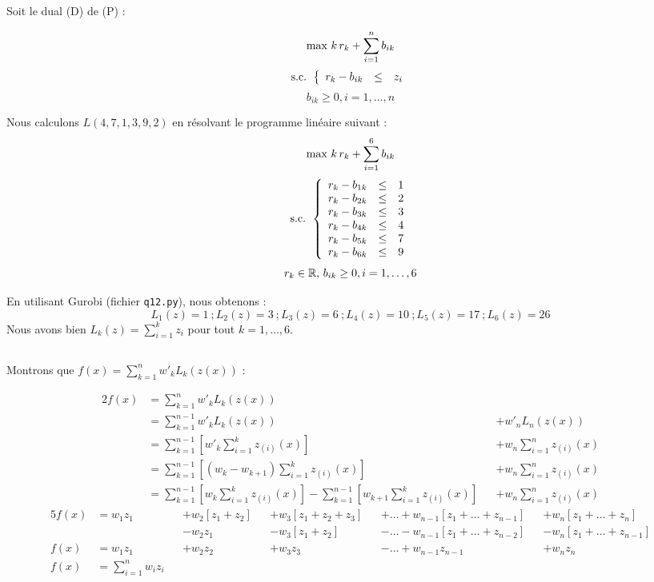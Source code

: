 \documentclass{article}
\begin{document}
Soit le dual (D) de (P) :

$$\textmd{max } k\,r_{k} + \sum_{i = 1}^{n}b_{ik}$$
$$ \textmd{s.c. }
\left \{
\begin{array}{r c l}
  r_k - b_{ik} & \leq & z_{i} \\
\end{array}
\right .
$$
$$b_{ik} \geq 0, i=1,\ldots,n$$

Nous calculons $L(4,7,1,3,9,2)$ en résolvant le programme linéaire suivant :
$$\textmd{max } k\,r_{k} + \sum_{i = 1}^{6}b_{ik}$$
$$ \textmd{s.c. }
\left \{
\begin{array}{r c l}
  r_k - b_{1k} & \leq & 1 \\
  r_k - b_{2k} & \leq & 2 \\
  r_k - b_{3k} & \leq & 3 \\
  r_k - b_{4k} & \leq & 4 \\
  r_k - b_{5k} & \leq & 7 \\
  r_k - b_{6k} & \leq & 9 \\
\end{array}
\right .
$$
$$r_k \in \mathbb{R} \textmd{, }b_{ik} \geq 0, i=1,\ldots,6$$

En utilisant Gurobi (fichier \texttt{q12.py}), nous obtenons : 
$$
L_1(z) = 1\:; L_2(z) = 3\:; L_3(z) = 6\:; L_4(z) = 10\:; L_5(z) = 17\:; L_6(z) = 26
$$
Nous avons bien $L_k(z) = \sum_{i=1}^k z_i$ pour tout $k = 1,\ldots,6$.


\subsection{}
Montrons que $f(x) = \sum_{k=1}^{n}w'_{k}L_{k}(z(x))$ :

\begin{alignat*}{2}
  f(x) &= \sum_{k=1}^{n}w'_{k}L_{k}(z(x)) \\
       &= \sum_{k=1}^{n-1}w'_{k}L_{k}(z(x))& &+ w'_{n}L_{n}(z(x)) \\
       &= \sum_{k=1}^{n-1} \left[ w'_{k} \sum_{i=1}^{k}z_{(i)}(x) \right] & &+ w_n \sum_{i=1}^{n}z_{(i)}(x) \\
       &= \sum_{k=1}^{n-1} \left[ (w_k - w_{k+1}) \sum_{i=1}^{k}z_{(i)}(x) \right] & &+ w_n \sum_{i=1}^{n}z_{(i)}(x) \\
       &= \sum_{k=1}^{n-1} \left[ w_k \sum_{i=1}^{k}z_{(i)}(x) \right] - \sum_{k=1}^{n-1} \left[ w_{k+1} \sum_{i=1}^{k}z_{(i)}(x) \right]& &+ w_n \sum_{i=1}^{n}z_{(i)}(x) 
\end{alignat*}
\begin{alignat*}{5}
f(x)&= w_1 z_1 & &+ w_2\left[z_1+z_2\right] & &+ w_3\left[z_1+z_2+z_3\right] & &+ \ldots + w_{n-1}\left[z_1+\ldots+z_{n-1}\right] & &+ w_n\left[z_1+\ldots+z_n\right] \\
& & &- w_2z_1 & & - w_3\left[z_1+z_2\right] & & - \ldots - w_{n-1}\left[z_1+\ldots+z_{n-2}\right] & &-w_n\left[z_1+\ldots+z_{n-1}\right] \\
f(x)&= w_1z_1& &+w_2z_2 & & +w_3z_3 & & - \ldots +w_{n-1}z_{n-1} & &+w_nz_n \\
f(x)&= \sum_{i=1}^{n}w_iz_i
\end{alignat*}
\end{document}
